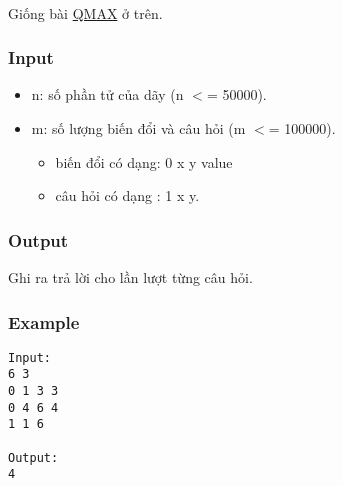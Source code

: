 

 

Giống bài \href{http://vnoi.info/problems/show/QMAX/}{QMAX} ở trên.

\subsubsection{Input}
\begin{itemize}
	\item n: số phần tử của dãy (n $<$= 50000).
	\item m: số lượng biến đổi và câu hỏi (m $<$= 100000).
\begin{itemize}
	\item biến đổi có dạng: 0 x y value
	\item câu hỏi có dạng : 1 x y.
\end{itemize}
\end{itemize}

\subsubsection{Output}

Ghi ra trả lời cho lần lượt từng câu hỏi.

\subsubsection{Example}
\begin{verbatim}
Input:
6 3
0 1 3 3
0 4 6 4
1 1 6

Output:
4
\end{verbatim}